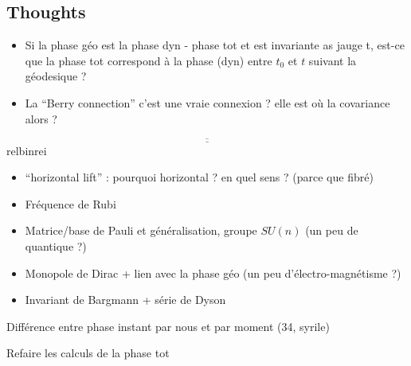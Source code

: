 \subsection{Thoughts}

\begin{itemize}
	\item Si la phase géo est la phase dyn - phase tot et est invariante as jauge t, est-ce que la phase tot correspond à la phase (dyn) entre $t_0$ et $t$ suivant la géodesique ?
	
	\item La ``Berry connection'' c'est une vraie connexion ? elle est où la covariance alors ?
\end{itemize}

\[\underline{\overline{\qquad\qquad\qquad\qquad\qquad\qquad\qquad\qquad\qquad\qquad\qquad\qquad\qquad\qquad\qquad\qquad\qquad\qquad}}\]{\color{white}relbinrei}

\begin{itemize}
	\item ``horizontal lift'' : pourquoi horizontal ? en quel sens ? (parce que fibré)
	
	\item Fréquence de Rubi
	
	\item Matrice/base de Pauli et généralisation, groupe $SU(n)$ (un peu de quantique ?)
	
	\item Monopole de Dirac + lien avec la phase géo (un peu d'électro-magnétisme ?)
	
	\item Invariant de Bargmann + série de Dyson
\end{itemize}


Différence entre phase instant par nous et par moment (34, syrile)

Refaire les calculs de la phase tot



\newpage

\listoffigures
\vfill
\lstlistoflistings
\vfill

\newpage

{}

